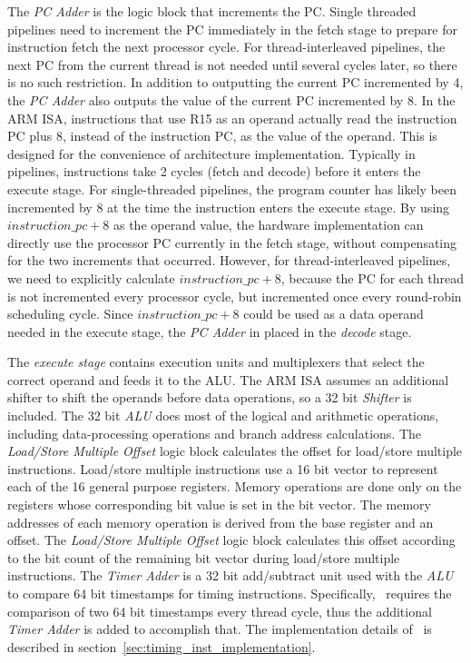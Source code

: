The \emph{PC Adder} is the logic block that increments the PC. 
Single threaded pipelines need to increment the PC immediately in the fetch stage to prepare for instruction fetch the next processor cycle.  
For thread-interleaved pipelines, the next PC from the current thread is not needed until several cycles later, so there is no such restriction.
In addition to outputting the current PC incremented by 4, the \emph{PC Adder} also outputs the value of the current PC incremented by 8.
In the ARM ISA, instructions that use R15 as an operand actually read the instruction PC plus 8, instead of the instruction PC, as the value of the operand.
This is designed for the convenience of architecture implementation. 
Typically in pipelines, instructions take 2 cycles (fetch and decode) before it enters the execute stage. 
For single-threaded pipelines, the program counter has likely been incremented by 8 at the time the instruction enters the execute stage.
By using $instruction\_pc+8$ as the operand value, the hardware implementation can directly use the processor PC currently in the fetch stage, without compensating for the two increments that occurred. 
However, for thread-interleaved pipelines, we need to explicitly calculate $instruction\_pc+8$, because the PC for each thread is not incremented every processor cycle, but incremented once every round-robin scheduling cycle.
Since $instruction\_pc+8$ could be used as a data operand needed in the execute stage, the \emph{PC Adder} in placed in the \emph{decode} stage.  

The \emph{execute stage} contains execution units and multiplexers that select the correct operand and feeds it to the ALU.  
The ARM ISA assumes an additional shifter to shift the operands before data operations, so a 32 bit \emph{Shifter} is included.
The 32 bit \emph{ALU} does most of the logical and arithmetic operations, including data-processing operations and branch address calculations.
The \emph{Load/Store Multiple Offset} logic block calculates the offset for load/store multiple instructions.
Load/store multiple instructions use a 16 bit vector to represent each of the 16 general purpose registers.
Memory operations are done only on the registers whose corresponding bit value is set in the bit vector.
The memory addresses of each memory operation is derived from the base register and an offset. 
The \emph{Load/Store Multiple Offset} logic block calculates this offset according to the bit count of the remaining bit vector during load/store multiple instructions.
The \emph{Timer Adder} is a 32 bit add/subtract unit used with the \emph{ALU} to compare 64 bit timestamps for timing instructions. 
Specifically, \delayuntil\ requires the comparison of two 64 bit timestamps every thread cycle, thus the additional \emph{Timer Adder} is added to accomplish that.  
The implementation details of \delayuntil\ is described in section~\ref{sec:timing_inst_implementation}.

